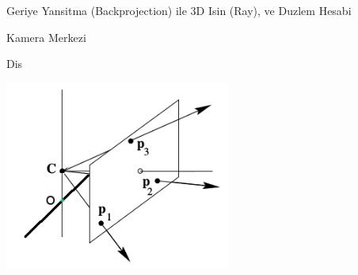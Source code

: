 \documentclass[12pt,fleqn]{article}\usepackage{../../common}
\begin{document}
Geriye Yansitma (Backprojection) ile 3D Isin (Ray), ve Duzlem Hesabi

Kamera Merkezi

Dis

\includegraphics[width=20em]{vision_80ray_01.png}
\end{document}
